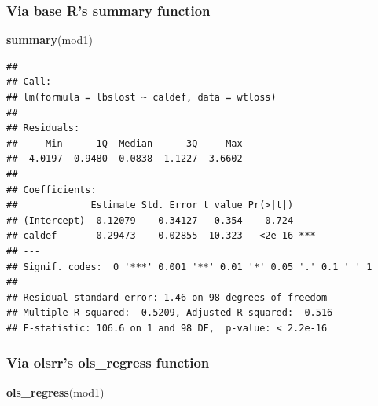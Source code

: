 \documentclass[]{article}
\newenvironment{Shaded}{\begin{snugshade}}{\end{snugshade}}
\newcommand{\KeywordTok}[1]{\textcolor[rgb]{0.13,0.29,0.53}{\textbf{#1}}}
\newcommand{\NormalTok}[1]{#1}
\begin{document}
\subsubsection{Via base R's summary
function}\label{via-base-rs-summary-function-1}

\begin{Shaded}
\begin{Highlighting}[]
\KeywordTok{summary}\NormalTok{(mod1)}
\end{Highlighting}
\end{Shaded}

\begin{verbatim}
## 
## Call:
## lm(formula = lbslost ~ caldef, data = wtloss)
## 
## Residuals:
##     Min      1Q  Median      3Q     Max 
## -4.0197 -0.9480  0.0838  1.1227  3.6602 
## 
## Coefficients:
##             Estimate Std. Error t value Pr(>|t|)    
## (Intercept) -0.12079    0.34127  -0.354    0.724    
## caldef       0.29473    0.02855  10.323   <2e-16 ***
## ---
## Signif. codes:  0 '***' 0.001 '**' 0.01 '*' 0.05 '.' 0.1 ' ' 1
## 
## Residual standard error: 1.46 on 98 degrees of freedom
## Multiple R-squared:  0.5209, Adjusted R-squared:  0.516 
## F-statistic: 106.6 on 1 and 98 DF,  p-value: < 2.2e-16
\end{verbatim}

\subsubsection{Via olsrr's ols\_regress
function}\label{via-olsrrs-ols_regress-function}

\begin{Shaded}
\begin{Highlighting}[]
\KeywordTok{ols_regress}\NormalTok{(mod1)}
\end{Highlighting}
\end{Shaded}
\end{document}
